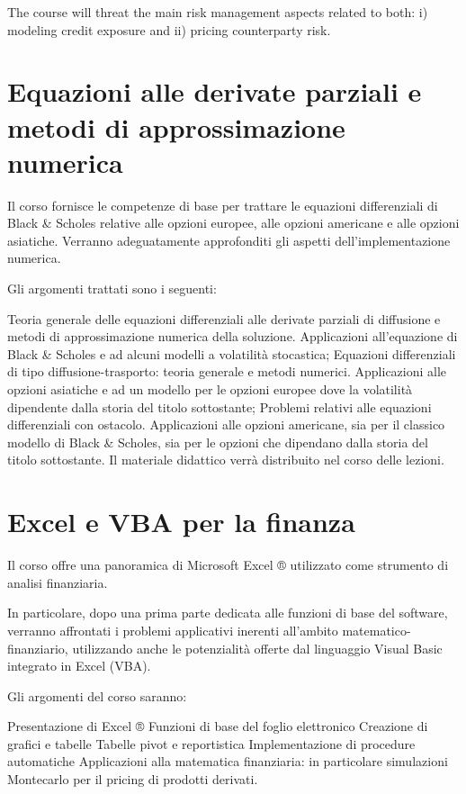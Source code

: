 The course will threat the main risk management aspects related to both: i) modeling credit exposure and ii) pricing counterparty risk.

\section{Equazioni alle derivate parziali e metodi di approssimazione numerica}
Il corso fornisce le competenze di base per trattare le equazioni differenziali di Black \& Scholes relative alle opzioni europee, alle opzioni americane e alle opzioni asiatiche. Verranno adeguatamente approfonditi gli aspetti dell'implementazione numerica.

Gli argomenti trattati sono i seguenti:

Teoria generale delle equazioni differenziali alle derivate parziali di diffusione e metodi di approssimazione numerica della soluzione. Applicazioni all'equazione di Black \& Scholes e ad alcuni modelli a volatilità stocastica;
Equazioni differenziali di tipo diffusione-trasporto: teoria generale e metodi numerici. Applicazioni alle opzioni asiatiche e ad un modello per le opzioni europee dove la volatilità dipendente dalla storia del titolo sottostante;
Problemi relativi alle equazioni differenziali con ostacolo. Applicazioni alle opzioni americane, sia per il classico modello di Black \& Scholes, sia per le opzioni che dipendano dalla storia del titolo sottostante.
Il materiale didattico verrà distribuito nel corso delle lezioni.

\section{Excel e VBA per la finanza}
Il corso offre una panoramica di Microsoft Excel ® utilizzato come strumento di analisi finanziaria.

In particolare, dopo una prima parte dedicata alle funzioni di base del software, verranno affrontati i problemi applicativi inerenti all'ambito matematico-finanziario, utilizzando anche le potenzialità offerte dal linguaggio Visual Basic integrato in Excel (VBA).

Gli argomenti del corso saranno:

Presentazione di Excel ®
Funzioni di base del foglio elettronico
Creazione di grafici e tabelle
Tabelle pivot e reportistica
Implementazione di procedure automatiche
Applicazioni alla matematica finanziaria: in particolare simulazioni Montecarlo per il pricing di prodotti derivati.


